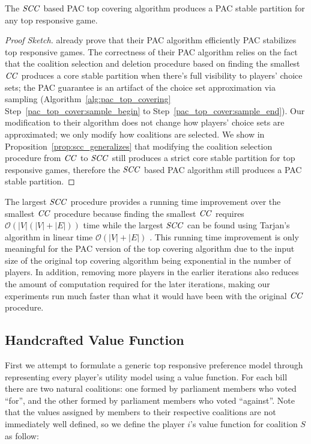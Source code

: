 \begin{theorem}
  The $\mathit{SCC}$ based PAC top covering algorithm produces a PAC stable partition
  for any top responsive game.
\end{theorem}

\begin{proof}[Proof Sketch]
 already prove that their PAC algorithm efficiently PAC
stabilizes top responsive games.
The correctness of their PAC algorithm relies on the fact that the coalition
selection and deletion procedure based on finding the smallest $\mathit{CC}$ produces
a core stable partition when there's full visibility to players' choice sets;
the PAC guarantee is an artifact of the choice set approximation via sampling
(Algorithm~\ref{alg:pac_top_covering} Step~\ref{pac_top_cover:sample_begin} to
Step~\ref{pac_top_cover:sample_end}).
Our modification to their algorithm does not change how players' choice sets
are approximated; we only modify how coalitions are selected.
We show in Proposition~\ref{prop:scc_generalizes} that modifying the coalition selection procedure from $\mathit{CC}$ to $\mathit{SCC}$ still produces a strict core stable partition for top responsive games, therefore the $\mathit{SCC}$ based PAC algorithm
still produces a PAC stable partition.
\end{proof}

The largest $\mathit{SCC}$ procedure provides a running time improvement over the
smallest $\mathit{CC}$ procedure because finding the smallest $\mathit{CC}$ requires
$\mathcal{O}(|V|(|V| + |E|))$ time while the largest $\mathit{SCC}$ can be found using
Tarjan's algorithm in linear time $\mathcal{O}(|V| + |E|)$ \cite{Tarjan72depthfirst}.
This running time improvement is only meaningful for the PAC version of the
top covering algorithm due to the input size of the original top covering
algorithm being exponential in the number of players.
In addition, removing more players in the earlier iterations also reduces
the amount of computation required for the later iterations, making our
experiments run much faster than what it would have been with the original
$\mathit{CC}$ procedure.


\subsection{Handcrafted Value Function}
\label{subsec:handcrafted_value_function}

First we attempt to formulate a generic top responsive preference model
through representing every player's utility model using a value function.
For each bill there are two natural coalitions:
one formed by parliament members who voted ``for'',
and the other formed by parliament members who voted ``against''.
Note that the values assigned by members to their respective coalitions
are not immediately well defined,
so we define the player $i$'s value function for coalition $S$ as follow:

